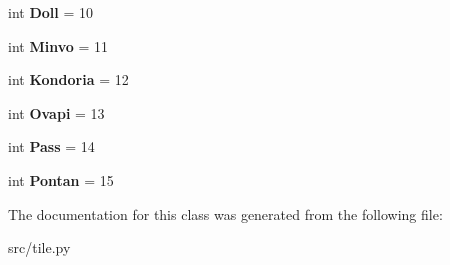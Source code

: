\begin{DoxyCompactItemize}
\item 
\hypertarget{classsrc_1_1tile_1_1_tile_aeed2c1217d02f0ca8ce5713f28a5543c}{}int {\bfseries Doll} = 10\label{classsrc_1_1tile_1_1_tile_aeed2c1217d02f0ca8ce5713f28a5543c}

\item 
\hypertarget{classsrc_1_1tile_1_1_tile_a5ca9bdbdf6863d2602f3f52adb749125}{}int {\bfseries Minvo} = 11\label{classsrc_1_1tile_1_1_tile_a5ca9bdbdf6863d2602f3f52adb749125}

\item 
\hypertarget{classsrc_1_1tile_1_1_tile_a7d7c123ec8ee03dc3b742828f9ee8690}{}int {\bfseries Kondoria} = 12\label{classsrc_1_1tile_1_1_tile_a7d7c123ec8ee03dc3b742828f9ee8690}

\item 
\hypertarget{classsrc_1_1tile_1_1_tile_a1de207d2b99c4d5978448b3e18e6ceef}{}int {\bfseries Ovapi} = 13\label{classsrc_1_1tile_1_1_tile_a1de207d2b99c4d5978448b3e18e6ceef}

\item 
\hypertarget{classsrc_1_1tile_1_1_tile_ac9fd73aea6f5bd2e72b5a76fe7c0045e}{}int {\bfseries Pass} = 14\label{classsrc_1_1tile_1_1_tile_ac9fd73aea6f5bd2e72b5a76fe7c0045e}

\item 
\hypertarget{classsrc_1_1tile_1_1_tile_a63e8749a3f0bca1c933dc2213ad519ba}{}int {\bfseries Pontan} = 15\label{classsrc_1_1tile_1_1_tile_a63e8749a3f0bca1c933dc2213ad519ba}

\end{DoxyCompactItemize}


The documentation for this class was generated from the following file\+:\begin{DoxyCompactItemize}
\item 
src/tile.\+py\end{DoxyCompactItemize}

